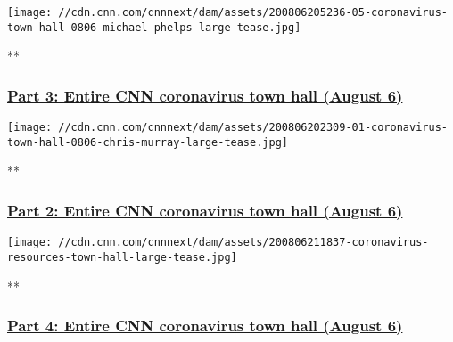 \texttt{[image: //cdn.cnn.com/cnnnext/dam/assets/200806205236-05-coronavirus-town-hall-0806-michael-phelps-large-tease.jpg]}

**

\hypertarget{part-3-entire-cnn-coronavirus-town-hall-august-6}{%
\subsubsection{\texorpdfstring{\href{/videos/health/2020/08/06/entire-august-6-coronavirus-town-hall-part-3-sot-vpx.cnn}{Part
3: Entire CNN coronavirus town hall (August
6)}}{Part 3: Entire CNN coronavirus town hall (August 6)}}\label{part-3-entire-cnn-coronavirus-town-hall-august-6}}

\href{/videos/health/2020/08/06/entire-august-6-coronavirus-town-hall-part-2-sot-vpx.cnn}{}

\texttt{[image: //cdn.cnn.com/cnnnext/dam/assets/200806202309-01-coronavirus-town-hall-0806-chris-murray-large-tease.jpg]}

**

\hypertarget{part-2-entire-cnn-coronavirus-town-hall-august-6}{%
\subsubsection{\texorpdfstring{\href{/videos/health/2020/08/06/entire-august-6-coronavirus-town-hall-part-2-sot-vpx.cnn}{Part
2: Entire CNN coronavirus town hall (August
6)}}{Part 2: Entire CNN coronavirus town hall (August 6)}}\label{part-2-entire-cnn-coronavirus-town-hall-august-6}}

\href{/videos/health/2020/08/06/entire-august-6-coronavirus-town-hall-part-4-sot-vpx.cnn}{}

\texttt{[image: //cdn.cnn.com/cnnnext/dam/assets/200806211837-coronavirus-resources-town-hall-large-tease.jpg]}

**

\hypertarget{part-4-entire-cnn-coronavirus-town-hall-august-6}{%
\subsubsection{\texorpdfstring{\href{/videos/health/2020/08/06/entire-august-6-coronavirus-town-hall-part-4-sot-vpx.cnn}{Part
4: Entire CNN coronavirus town hall (August
6)}}{Part 4: Entire CNN coronavirus town hall (August 6)}}\label{part-4-entire-cnn-coronavirus-town-hall-august-6}}

\href{/videos/health/2020/08/06/entire-august-6-coronavirus-town-hall-part-1-sot-vpx.cnn}{}


